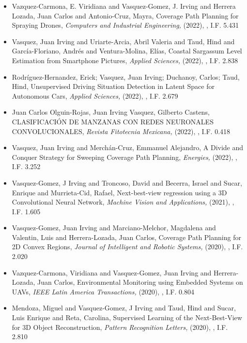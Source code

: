 \begin{itemize}
\item Vazquez-Carmona, E. Viridiana and Vasquez-Gomez, J. Irving and Herrera Lozada, Juan Carlos and Antonio-Cruz, Mayra, Coverage Path Planning for Spraying Drones,\textit{ Computers and Industrial Engineering,} (2022), \href{https://doi.org/10.1016/j.cie.2022.108125} {\faExternalLink}, I.F. 5.431 
\item Vasquez, Juan Irving and Uriarte-Arcia, Abril Valeria and Taud, Hind and García-Floriano, Andrés and Ventura-Molina, Elías, Coastal Sargassum Level Estimation from Smartphone Pictures,\textit{ Applied Sciences,} (2022), \href{https://doi.org/10.3390/app121910012} {\faExternalLink}, I.F. 2.838 
\item Rodríguez-Hernandez, Erick; Vasquez, Juan Irving; Duchanoy, Carlos; Taud, Hind, Unsupervised Driving Situation Detection in Latent Space for Autonomous Cars,\textit{ Applied Sciences,} (2022), \href{https://doi.org/10.3390/app12073635} {\faExternalLink}, I.F. 2.679 
\item Juan Carlos Olguin-Rojas, Juan Irving Vasquez, Gilberto Castens, CLASIFICACIÓN DE MANZANAS CON REDES NEURONALES CONVOLUCIONALES,\textit{ Revista Fitotecnia Mexicana,} (2022), \href{https://doi.org/10.35196/rfm.2022.3.369} {\faExternalLink}, I.F. 0.418 
\item Vasquez, Juan Irving and Merchán-Cruz, Emmanuel Alejandro, A Divide and Conquer Strategy for Sweeping Coverage Path Planning,\textit{ Energies,} (2022), \href{https://doi.org/10.3390/en15217898} {\faExternalLink}, I.F. 3.252 
\item Vasquez-Gomez, J Irving and Troncoso, David and Becerra, Israel and Sucar, Enrique and Murrieta-Cid, Rafael, Next-best-view regression using a 3D Convolutional Neural Network,\textit{ Machine Vision and Applications,} (2021), \href{https://doi.org/10.1007/s00138-020-01166-2} {\faExternalLink}, I.F. 1.605 
\item Vasquez-Gomez, Juan Irving and Marciano-Melchor, Magdalena and Valentin, Luis and Herrera-Lozada, Juan Carlos, Coverage Path Planning for 2D Convex Regions,\textit{ Journal of Intelligent and Robotic Systems,} (2020), \href{https://doi.org/10.1007/s10846-019-01024-y} {\faExternalLink}, I.F. 2.020 
\item Vazquez-Carmona, Viridiana and Vasquez-Gomez, Juan Irving and Herrera-Lozada, Juan Carlos, Environmental Monitoring using Embedded Systems on UAVs,\textit{ IEEE Latin America Transactions,} (2020), \href{https://doi.org/10.1109/TLA.2020.9085284} {\faExternalLink}, I.F. 0.804 
\item Mendoza, Miguel and Vasquez-Gomez, J Irving and Taud, Hind and Sucar, Luis Enrique and Reta, Carolina, Supervised Learning of the Next-Best-View for 3D Object Reconstruction,\textit{ Pattern Recognition Letters,} (2020), \href{https://doi.org/10.1016/j.patrec.2020.02.024} {\faExternalLink}, I.F. 2.810 

\end{itemize}
